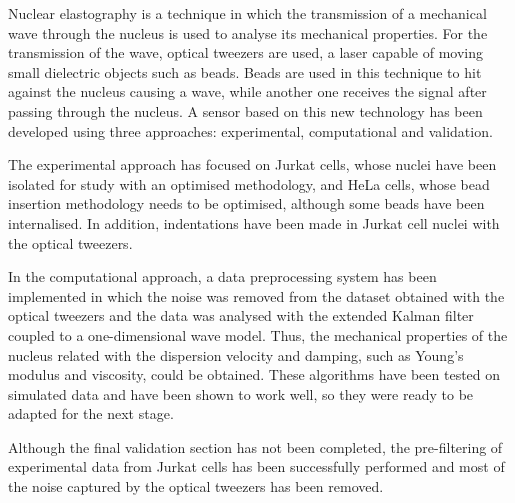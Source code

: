 \documentclass[12pt, a4paper]{article} %
\begin{document}
Nuclear elastography is a technique in which the transmission of a mechanical wave through the nucleus is used to analyse its mechanical properties. For the transmission of the wave, optical tweezers are used, a laser capable of moving small dielectric objects such as beads. Beads are used in this technique to hit against the nucleus causing a wave, while another one receives the signal after passing through the nucleus. A sensor based on this new technology has been developed using three approaches: experimental, computational and validation. 

The experimental approach has focused on Jurkat cells, whose nuclei have been isolated for study with an optimised methodology, and HeLa cells, whose bead insertion methodology needs to be optimised, although some beads have been internalised. In addition, indentations have been made in Jurkat cell nuclei with the optical tweezers.

In the computational approach, a data preprocessing system has been implemented in which the noise was removed from the dataset obtained with the optical tweezers and the data was analysed with the extended Kalman filter coupled to a one-dimensional wave model. Thus, the mechanical properties of the nucleus related with the dispersion velocity and damping, such as Young's modulus and viscosity, could be obtained. These algorithms have been tested on simulated data and have been shown to work well, so they were ready to be adapted for the next stage.

Although the final validation section has not been completed, the pre-filtering of experimental data from Jurkat cells has been successfully performed and most of the noise captured by the optical tweezers has been removed.


\vspace{1cm}

\newpage


\tableofcontents
\setcounter{tocdepth}{2}
\newpage

\setcounter{page}{1}
\pagestyle{fancy}
\lhead{ }
\renewcommand{\headrulewidth}{0.005pt}

\setlength{\parskip}{0mm}
\end{document}
